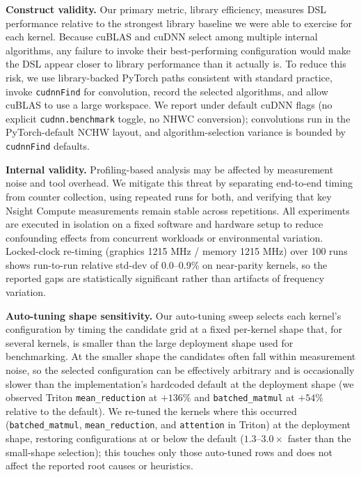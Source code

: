 \textbf{Construct validity.}
Our primary metric, library efficiency, measures DSL performance relative to the strongest library baseline we were able to exercise for each kernel. Because cuBLAS and cuDNN select among multiple internal algorithms, any failure to invoke their best-performing configuration would make the DSL appear closer to library performance than it actually is. To reduce this risk, we use library-backed PyTorch paths consistent with standard practice, invoke \texttt{cudnnFind} for convolution, record the selected algorithms, and allow cuBLAS to use a large workspace.
We report under default cuDNN flags (no explicit \texttt{cudnn.benchmark} toggle, no NHWC conversion); convolutions run in the PyTorch-default NCHW layout, and algorithm-selection variance is bounded by \texttt{cudnnFind} defaults.

\textbf{Internal validity.}
Profiling-based analysis may be affected by measurement noise and tool overhead. We mitigate this threat by separating end-to-end timing from counter collection, using repeated runs for both, and verifying that key Nsight Compute measurements remain stable across repetitions. All experiments are executed in isolation on a fixed software and hardware setup to reduce confounding effects from concurrent workloads or environmental variation. Locked-clock re-timing (graphics 1215 MHz / memory 1215 MHz) over 100 runs shows run-to-run relative std-dev of 0.0--0.9\% on near-parity kernels, so the reported gaps are statistically significant rather than artifacts of frequency variation.

\textbf{Auto-tuning shape sensitivity.}
Our auto-tuning sweep selects each kernel's configuration by timing the candidate grid at a fixed per-kernel shape that, for several kernels, is smaller than the large deployment shape used for benchmarking.
At the smaller shape the candidates often fall within measurement noise, so the selected configuration can be effectively arbitrary and is occasionally slower than the implementation's hardcoded default at the deployment shape (we observed Triton \texttt{mean\_reduction} at $+136\%$ and \texttt{batched\_matmul} at $+54\%$ relative to the default).
We re-tuned the kernels where this occurred (\texttt{batched\_matmul}, \texttt{mean\_reduction}, and \texttt{attention} in Triton) at the deployment shape, restoring configurations at or below the default ($1.3$--$3.0\times$ faster than the small-shape selection); this touches only those auto-tuned rows and does not affect the reported root causes or heuristics.

